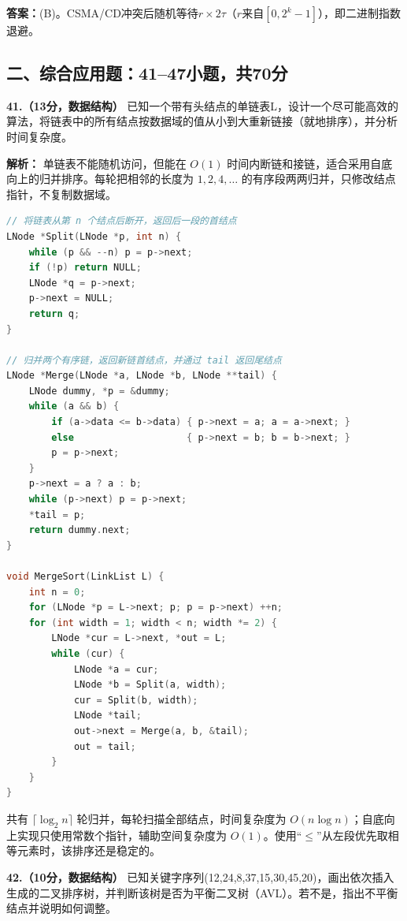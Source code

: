 \ifshowsolutions\par\noindent\textbf{答案：}(B)。CSMA/CD冲突后随机等待$r\times2\tau$（$r$来自$[0,2^k-1]$），即二进制指数退避。\else \answerarea \fi

\newpage

\subsection*{二、综合应用题：41--47小题，共70分}

\noindent\textbf{41.（13分，数据结构）} 已知一个带有头结点的单链表L，设计一个尽可能高效的算法，将链表中的所有结点按数据域的值从小到大重新链接（就地排序），并分析时间复杂度。

\ifshowsolutions\par\noindent\textbf{解析：} 单链表不能随机访问，但能在 $O(1)$ 时间内断链和接链，适合采用自底向上的归并排序。每轮把相邻的长度为 $1,2,4,\ldots$ 的有序段两两归并，只修改结点指针，不复制数据域。
\begin{lstlisting}[language=C]
// 将链表从第 n 个结点后断开，返回后一段的首结点
LNode *Split(LNode *p, int n) {
    while (p && --n) p = p->next;
    if (!p) return NULL;
    LNode *q = p->next;
    p->next = NULL;
    return q;
}

// 归并两个有序链，返回新链首结点，并通过 tail 返回尾结点
LNode *Merge(LNode *a, LNode *b, LNode **tail) {
    LNode dummy, *p = &dummy;
    while (a && b) {
        if (a->data <= b->data) { p->next = a; a = a->next; }
        else                    { p->next = b; b = b->next; }
        p = p->next;
    }
    p->next = a ? a : b;
    while (p->next) p = p->next;
    *tail = p;
    return dummy.next;
}

void MergeSort(LinkList L) {
    int n = 0;
    for (LNode *p = L->next; p; p = p->next) ++n;
    for (int width = 1; width < n; width *= 2) {
        LNode *cur = L->next, *out = L;
        while (cur) {
            LNode *a = cur;
            LNode *b = Split(a, width);
            cur = Split(b, width);
            LNode *tail;
            out->next = Merge(a, b, &tail);
            out = tail;
        }
    }
}
\end{lstlisting}
共有 $\lceil\log_2 n\rceil$ 轮归并，每轮扫描全部结点，时间复杂度为 $O(n\log n)$；自底向上实现只使用常数个指针，辅助空间复杂度为 $O(1)$。使用“$\leqslant$”从左段优先取相等元素时，该排序还是稳定的。\else \answerarea[8] \fi

\vspace{8pt}

\noindent\textbf{42.（10分，数据结构）} 已知关键字序列(12,24,8,37,15,30,45,20)，画出依次插入生成的二叉排序树，并判断该树是否为平衡二叉树（AVL）。若不是，指出不平衡结点并说明如何调整。

